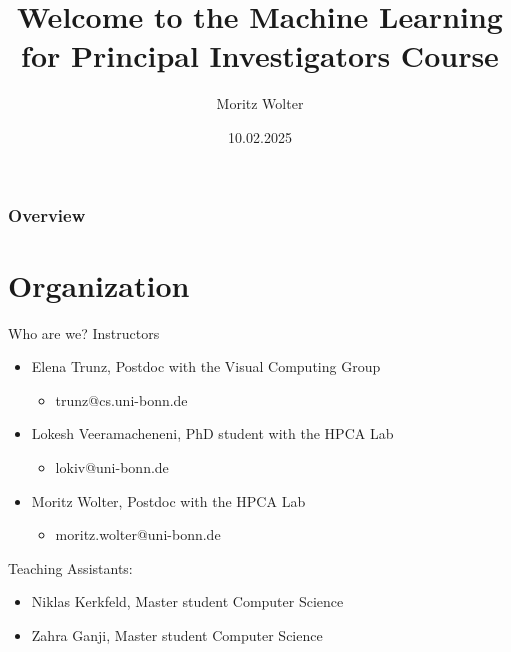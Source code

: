 \documentclass{beamer}
\title{Welcome to the Machine Learning for Principal Investigators Course}
\date{10.02.2025}
\institute{High-Performance Computing and Analytics Lab, Universität Bonn}
\author{Moritz Wolter}
\begin{document}
    \maketitle

    \begin{frame}
    \frametitle{Overview} 
    \tableofcontents
    \end{frame}

    \section{Organization}
    \begin{frame}{Who are we?}
      Instructors
      \begin{itemize}
        \item Elena Trunz, Postdoc with the Visual Computing Group
        \begin{itemize}
          \item trunz@cs.uni-bonn.de
        \end{itemize}
        \item Lokesh Veeramacheneni, PhD student with the HPCA Lab
        \begin{itemize}
          \item lokiv@uni-bonn.de
        \end{itemize}
        \item Moritz Wolter, Postdoc with the HPCA Lab
        \begin{itemize}
          \item moritz.wolter@uni-bonn.de
        \end{itemize}
      \end{itemize}
      Teaching Assistants:
      \begin{itemize}
        \item Niklas Kerkfeld, Master student Computer Science
        \item Zahra Ganji, Master student Computer Science
      \end{itemize}
    \end{frame}
\end{document}
